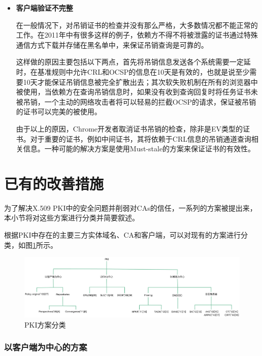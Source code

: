 \begin{itemize}
	\item 

	\noindent\textbf{客户端验证不完整}

	在一般情况下，对吊销证书的检查并没有那么严格，大多数情况都不能正常的工作。在2011年中有很多这样的例子，依赖方不得不将被泄露的证书通过特殊通信方式下载并存储在黑名单中，来保证吊销查询是可靠的。

	这样做的原因主要包括以下两点，首先将吊销信息发送各个系统需要一定延时，在基准规则中允许CRL和OCSP的信息在10天是有效的，也就是说至少需要10天才能保证吊销信息被完全扩散出去；其次软失败机制在所有的浏览器中被使用，当依赖方在查询吊销信息时，如果没有收到查询回复时将任务证书未被吊销，一个主动的网络攻击者将可以轻易的拦截OCSP的请求，保证被吊销的证书可以完美的被使用。

	由于以上的原因，Chrome开发者取消证书吊销的检查，除非是EV类型的证书。对于重要的证书，例如中间证书，其将依赖于CRL信息的吊销通道查询相关信息。一种可能的解决方案是使用Must-stale的方案来保证证书的有效性。

\end{itemize}


\section{已有的改善措施}

为了解决X.509 PKI中的安全问题并削弱对CAs的信任，一系列的方案被提出来，本小节将对这些方案进行分类并简要叙述。



根据PKI中存在的主要三方实体域名、CA和客户端，可以对现有的方案进行分类，如图\ref{fig:Classification_of_PKI_proposals}所示。

\begin{figure}[htbp]
 	\centering
 	\includegraphics[width = 1.0\textwidth]{img/Classification_of_PKI_proposals}
 	\caption{PKI方案分类}\label{fig:Classification_of_PKI_proposals}
\end{figure}



\subsubsection{以客户端为中心的方案}


